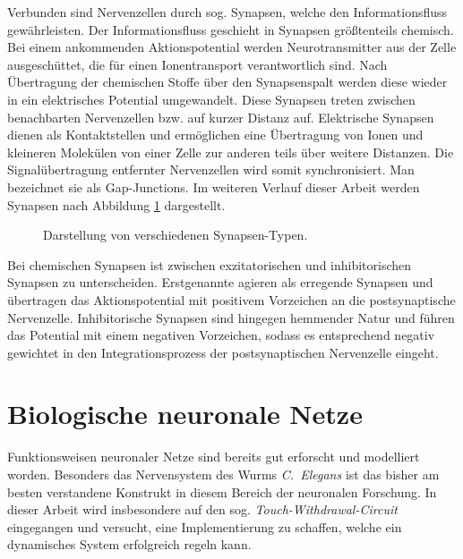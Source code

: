 	Verbunden sind Nervenzellen durch sog. Synapsen, welche den Informationsfluss gewährleisten. Der Informationsfluss geschieht in Synapsen größtenteils chemisch. Bei einem ankommenden Aktionspotential werden Neurotransmitter aus der Zelle ausgeschüttet, die für einen Ionentransport verantwortlich sind. Nach Übertragung der chemischen Stoffe über den Synapsenspalt werden diese wieder in ein elektrisches Potential umgewandelt. Diese Synapsen treten zwischen benachbarten Nervenzellen bzw. auf kurzer Distanz auf. Elektrische Synapsen  dienen als Kontaktstellen und ermöglichen eine Übertragung von Ionen und kleineren Molekülen von einer Zelle zur anderen teils über weitere Distanzen. Die Signalübertragung entfernter Nervenzellen wird somit synchronisiert. Man bezeichnet sie als \glqq Gap-Junctions\grqq. Im weiteren Verlauf dieser Arbeit werden Synapsen nach Abbildung \ref{fig:synapse} dargestellt.
	\begin{figure}[H] %
		\centering
		\def\svgwidth{12cm}
		
		\caption{Darstellung von verschiedenen Synapsen-Typen.}
		\label{fig:synapse}
	\end{figure}
	Bei chemischen Synapsen ist zwischen exzitatorischen und inhibitorischen Synapsen zu unterscheiden. Erstgenannte agieren als erregende Synapsen und übertragen das Aktionspotential mit positivem Vorzeichen an die postsynaptische Nervenzelle. Inhibitorische Synapsen sind hingegen hemmender Natur und führen das Potential mit einem negativen Vorzeichen, sodass es entsprechend negativ gewichtet in den Integrationsprozess der postsynaptischen Nervenzelle eingeht.
\section{Biologische neuronale Netze}
\label{sec:neuro_netz}
	Funktionsweisen neuronaler Netze sind bereits gut erforscht und modelliert worden. Besonders das Nervensystem des Wurms \textit{C.~Elegans} \cite{CElegans} ist das bisher am besten verstandene Konstrukt in diesem Bereich der neuronalen Forschung. In dieser Arbeit wird insbesondere auf den sog. \textit{Touch-Withdrawal-Circuit} eingegangen und versucht, eine Implementierung zu schaffen, welche ein dynamisches System erfolgreich regeln kann.
	
